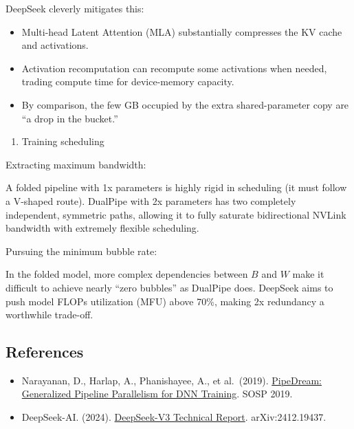 DeepSeek cleverly mitigates this:

\begin{itemize}
\tightlist
\item
  Multi-head Latent Attention (MLA) substantially compresses the KV cache and activations.
\item
  Activation recomputation can recompute some activations when needed, trading compute time for device-memory capacity.
\item
  By comparison, the few GB occupied by the extra shared-parameter copy are ``a drop in the bucket.''
\end{itemize}

\begin{enumerate}
\def\labelenumi{\arabic{enumi}.}
\setcounter{enumi}{2}
\tightlist
\item
  Training scheduling
\end{enumerate}

Extracting maximum bandwidth:

A folded pipeline with 1x parameters is highly rigid in scheduling (it must follow a V-shaped route). DualPipe with 2x parameters has two completely independent, symmetric paths, allowing it to fully saturate bidirectional NVLink bandwidth with extremely flexible scheduling.

Pursuing the minimum bubble rate:

In the folded model, more complex dependencies between \(B\) and \(W\) make it difficult to achieve nearly ``zero bubbles'' as DualPipe does. DeepSeek aims to push model FLOPs utilization (MFU) above 70\%, making 2x redundancy a worthwhile trade-off.

\FloatBarrier
{}
\hypertarget{references-37}{%
\subsection{References}\label{references-37}}

\vspace{0.25em}
\begin{itemize}
\tightlist
\item
  Narayanan, D., Harlap, A., Phanishayee, A., et al.~(2019). \href{https://dl.acm.org/doi/10.1145/3341301.3359646}{PipeDream: Generalized Pipeline Parallelism for DNN Training}. SOSP 2019.
\item
  DeepSeek-AI. (2024). \href{https://arxiv.org/abs/2412.19437}{DeepSeek-V3 Technical Report}. arXiv:2412.19437.
\end{itemize}

\clearpage
